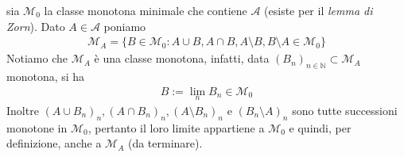 \documentclass[oneside, 11pt]{amsbook}
\makeatletter
\newcommand{\0}{{(0)}}
\newcommand{\3}{{(3)}}
\theoremstyle{colonplain}
\theoremstyle{colondefinition}
\theoremstyle{colonremark}
\numberwithin{equation}{chapter}
\renewcommand{\proofname}{Dimostrazione}
\renewenvironment{proof}[1][\proofname]{\par
  \pushQED{\qed}%
  \normalfont \topsep6\p@\@plus6\p@\relax
  \trivlist
  \item[\hskip\labelsep\bfseries #1:]\ignorespaces
}{%
  \popQED\endtrivlist\@endpefalse
}
\makeatother
\begin{document}
\begin{proof}
sia $\mathcal{M}_0$ la classe monotona minimale che contiene $\mathcal{A}$ (esiste per il \textit{lemma di Zorn}). Dato $A \in \mathcal{A}$ poniamo
\begin{align}
    \mathcal{M}_A = \{B \in \mathcal{M}_0 : A \cup B, A \cap B, A \setminus B, B \setminus A \in \mathcal{M}_0\} 
\end{align}
Notiamo che $\mathcal{M}_A$ è una classe monotona, infatti, data $(B_n)_{n \in \mathbb{N}} \subset \mathcal{M}_A$ monotona, si ha
\begin{align}
    B := \lim_n B_n \in \mathcal{M}_0
\end{align}
Inoltre $(A \cup B_n)_n, (A \cap B_n)_n, (A \setminus B_n)_n$ e $(B_n \setminus A)_n$ sono tutte successioni monotone in $\mathcal{M}_0$, pertanto il loro limite appartiene a $\mathcal{M}_0$ e quindi, per definizione, anche a $\mathcal{M}_A$ (da terminare).
\end{proof}
\end{document}
